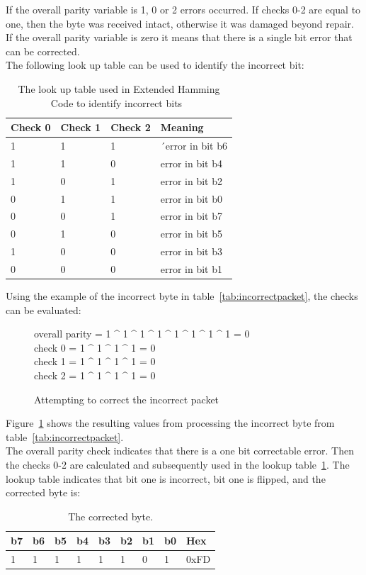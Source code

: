 \documentclass[draft,preprint,12pt,3p]{elsarticle}
\begin{document}
If the overall parity variable is 1, 0 or 2 errors occurred. If checks 0-2 are equal to one, then the byte was received intact, otherwise it was damaged beyond repair.\\
If the overall parity variable is zero it means that there is a single bit error that can be corrected.\\
The following look up table can be used to identify the incorrect bit:
\begin{table}[H]
\centering
\begin{tabular}{| l | l | l | l |}
\hline
Check 0 & Check 1 & Check 2 & Meaning\\ \hline
1 & 1 & 1 &´error in bit b6\\ \hline
1 & 1 & 0 & error in bit b4\\ \hline
1 & 0 & 1 & error in bit b2\\ \hline
0 & 1 & 1 & error in bit b0\\ \hline
0 & 0 & 1 & error in bit b7\\ \hline
0 & 1 & 0 & error in bit b5\\ \hline
1 & 0 & 0 & error in bit b3\\ \hline
0 & 0 & 0 & error in bit b1\\ \hline
\end{tabular}
\caption{The look up table used in Extended Hamming Code to identify incorrect bits~\cite{extendedhamming}}
\label{tab:paritylookup}
\end{table}

Using the example of the incorrect byte in table~\ref{tab:incorrectpacket}, the checks can be evaluated:
\begin{figure}[H]
\centering
overall parity = 1 \^{} 1 \^{} 1 \^{} 1 \^{} 1 \^{} 1 \^{} 1 \^{} 1 = 0\\
check 0 = 1 \^{} 1 \^{} 1 \^{} 1 = 0\\
check 1 = 1 \^{} 1 \^{} 1 \^{} 1 = 0\\
check 2 = 1 \^{} 1 \^{} 1 \^{} 1 = 0\\
\caption{Attempting to correct the incorrect packet}
\label{fig:xorexample}
\end{figure}
Figure~\ref{fig:xorexample} shows the resulting values from processing the incorrect byte from table~\ref{tab:incorrectpacket}.\\
The overall parity check indicates that there is a one bit correctable error. Then the checks 0-2 are calculated and subsequently used in the lookup table~\ref{tab:paritylookup}. The lookup table indicates that bit one is incorrect, bit one is flipped, and the corrected byte is:
\begin{table}[H]
\centering
\begin{tabular}{| l | l | l | l | l | l | l | l | l |}
\hline
b7 & b6 & b5 & b4 & b3 & b2 & b1 & b0 & Hex\\ \hline
1 & 1 & 1 & 1 & 1 & 1 & 0 & 1  & 0xFD\\ \hline
\end{tabular}
\caption{The corrected byte.}
\label{tab:correctedbyte}
\end{table}
\end{document}
